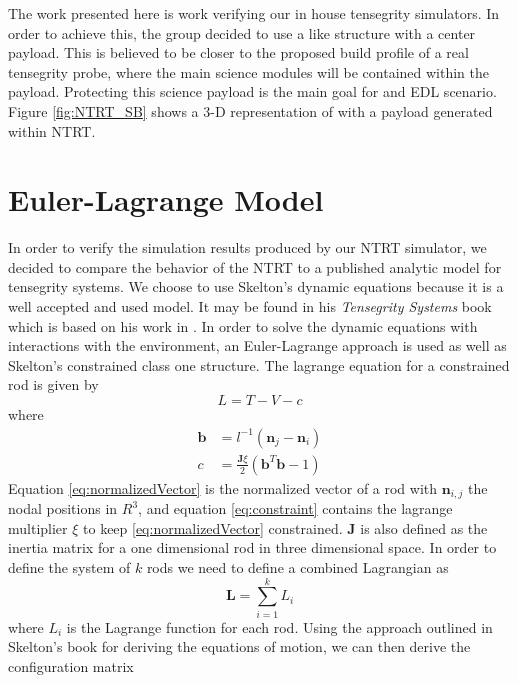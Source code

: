The work presented here is work verifying our in house tensegrity simulators.
In order to achieve this, the group decided to use a \SB{} like structure with a center payload.
This is believed to be closer to the proposed build profile of a real tensegrity probe, where the main science modules will be contained within the payload.
Protecting this science payload is the main goal for and EDL scenario.
Figure \ref{fig:NTRT_SB} shows a 3-D representation of \SB{} with a payload generated within NTRT.

\section{Euler-Lagrange Model}
In order to verify the simulation results produced by our NTRT simulator, we decided to compare the behavior of the NTRT to a published analytic model for tensegrity systems.
We choose to use Skelton's dynamic equations because it is a well accepted and used model.
It may be found in his \emph{Tensegrity Systems} book \cite{skelton_tensegrity_2009} which is based on his work in \cite{skelton2005dynamics}.
In order to solve the dynamic equations with interactions with the environment, an Euler-Lagrange approach is used as well as Skelton's constrained class one structure.
The lagrange equation for a constrained rod is given by
\begin{equation}
\label{eq:lagrange}
L = T - V - c
\end{equation}
where
\begin{align}
\mathbf{b} &= l^{-1}(\mathbf{n}_{j}-\mathbf{n}_{i})\label{eq:normalizedVector}\\
c &= \frac{\mathbf{J}\xi}{2}(\mathbf{b}^{T}\mathbf{b}-1)\label{eq:constraint}
\end{align} 
Equation \eqref{eq:normalizedVector} is the normalized vector of a rod with \(\mathbf{n}_{i,j}\) the nodal positions in \(R^3\), and equation \eqref{eq:constraint} contains the lagrange multiplier \(\xi\) to keep \eqref{eq:normalizedVector} constrained.
\(\mathbf{J}\) is also defined as the inertia matrix for a one dimensional rod in three dimensional space.
In order to define the system of \(k\) rods we need to define a combined Lagrangian as
\begin{equation}
\mathbf{L} = \sum_{i=1}^{k} L_{i}\label{eq:combinedLagrangian}
\end{equation}
where \(L_{i}\) is the Lagrange function for each rod.
Using the approach outlined in Skelton's book for deriving the equations of motion, we can then derive the configuration matrix

